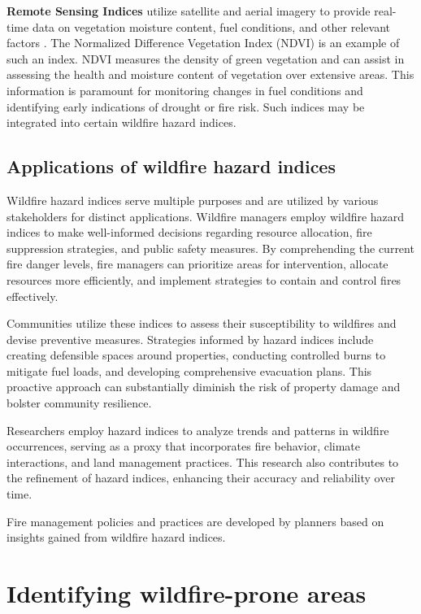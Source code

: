 \documentclass[
  12 pt,
]{Nemilov}
\begin{document}
\textbf{Remote Sensing Indices} utilize satellite and aerial imagery to provide real-time data on vegetation moisture content, fuel conditions, and other relevant factors \citep{leblon2001forest}. The Normalized Difference Vegetation Index (NDVI) \citep{rouse1974monitoring} is an example of such an index. NDVI measures the density of green vegetation and can assist in assessing the health and moisture content of vegetation over extensive areas. This information is paramount for monitoring changes in fuel conditions and identifying early indications of drought or fire risk. Such indices may be integrated into certain wildfire hazard indices.

\subsection{Applications of wildfire hazard indices}\label{applications-of-wildfire-hazard-indices}

Wildfire hazard indices serve multiple purposes and are utilized by various stakeholders for distinct applications. Wildfire managers employ wildfire hazard indices to make well-informed decisions regarding resource allocation, fire suppression strategies, and public safety measures. By comprehending the current fire danger levels, fire managers can prioritize areas for intervention, allocate resources more efficiently, and implement strategies to contain and control fires effectively.

Communities utilize these indices to assess their susceptibility to wildfires and devise preventive measures. Strategies informed by hazard indices include creating defensible spaces around properties, conducting controlled burns to mitigate fuel loads, and developing comprehensive evacuation plans. This proactive approach can substantially diminish the risk of property damage and bolster community resilience.

Researchers employ hazard indices to analyze trends and patterns in wildfire occurrences, serving as a proxy that incorporates fire behavior, climate interactions, and land management practices. This research also contributes to the refinement of hazard indices, enhancing their accuracy and reliability over time.

Fire management policies and practices are developed by planners based on insights gained from wildfire hazard indices.

\section{Identifying wildfire-prone areas}\label{identifying-wildfire-prone-areas}
\end{document}
